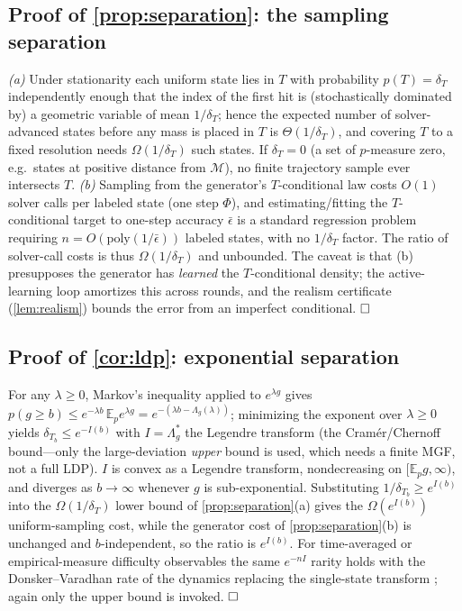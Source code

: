 \documentclass{article}
\theoremstyle{plain}
\theoremstyle{definition}
\theoremstyle{remark}
\newcommand{\E}{\mathbb{E}}
\newcommand{\manifold}{\mathcal{M}}
\newcommand{\sol}{\Phi}
\newcommand{\pnat}{p}
\begin{document}
\subsection{Proof of \cref{prop:separation}: the sampling separation}\label{app:separation}
\emph{(a)} Under stationarity each uniform state lies in $T$ with probability $\pnat(T)=\delta_T$
independently enough that the index of the first hit is (stochastically dominated by) a geometric variable
of mean $1/\delta_T$; hence the expected number of solver-advanced states before any mass is placed in $T$
is $\Theta(1/\delta_T)$, and covering $T$ to a fixed resolution needs $\Omega(1/\delta_T)$ such states. If
$\delta_T=0$ (a set of $\pnat$-measure zero, e.g.\ states at positive distance from $\manifold$), no finite
trajectory sample ever intersects $T$. \emph{(b)} Sampling from the generator's $T$-conditional law costs
$O(1)$ solver calls per labeled state (one step $\sol$), and estimating/fitting the $T$-conditional target
to one-step accuracy $\bar\epsilon$ is a standard regression problem requiring
$n=O(\mathrm{poly}(1/\bar\epsilon))$ labeled states, with no $1/\delta_T$ factor. The ratio of solver-call
costs is thus $\Omega(1/\delta_T)$ and unbounded. The caveat is that (b) presupposes the generator has
\emph{learned} the $T$-conditional density; the active-learning loop amortizes this across rounds, and the
realism certificate (\cref{lem:realism}) bounds the error from an imperfect conditional. $\hfill\square$

\subsection{Proof of \cref{cor:ldp}: exponential separation}\label{app:ldp}
For any $\lambda\ge0$, Markov's inequality applied to $e^{\lambda g}$ gives
$\pnat(g\ge b)\le e^{-\lambda b}\,\E_{\pnat}e^{\lambda g}=e^{-(\lambda b-\Lambda_g(\lambda))}$; minimizing the
exponent over $\lambda\ge0$ yields $\delta_{T_b}\le e^{-I(b)}$ with $I=\Lambda_g^\ast$ the Legendre transform
(the Cram\'er/Chernoff bound---only the large-deviation \emph{upper} bound is used, which needs a finite MGF,
not a full LDP). $I$ is convex as a Legendre transform, nondecreasing on $[\E_{\pnat}g,\infty)$, and diverges
as $b\to\infty$ whenever $g$ is sub-exponential. Substituting $1/\delta_{T_b}\ge e^{I(b)}$ into the
$\Omega(1/\delta_T)$ lower bound of \cref{prop:separation}(a) gives the $\Omega(e^{I(b)})$ uniform-sampling
cost, while the generator cost of \cref{prop:separation}(b) is unchanged and $b$-independent, so the ratio is
$e^{I(b)}$. For time-averaged or empirical-measure difficulty observables the same $e^{-nI}$ rarity holds
with the Donsker--Varadhan rate of the dynamics replacing the single-state transform
\citep{donsker1975asymptotic,dembo1998large}; again only the upper bound is invoked. $\hfill\square$
\end{document}
